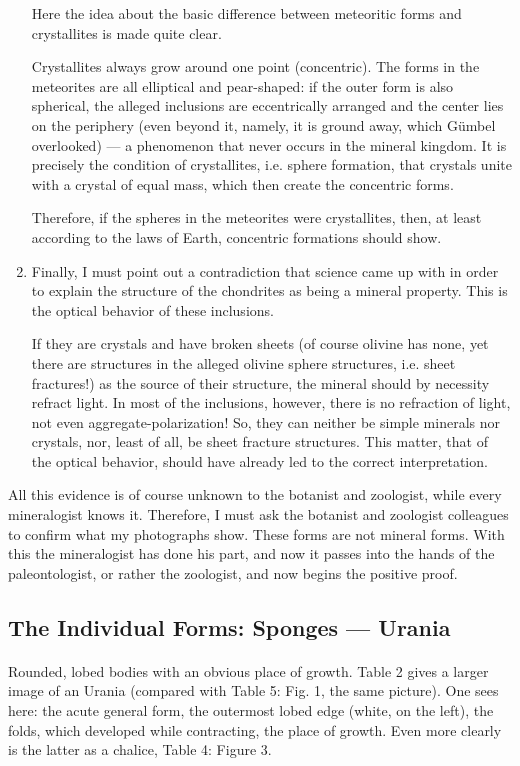 \documentclass[a4paper, 11pt, oneside]{article}
\begin{document}
\begin{enumerate}
    Here the idea about the basic difference between meteoritic forms and crystallites is made quite clear.
    
    Crystallites always grow around one point (concentric). The forms in the meteorites are all elliptical and pear-shaped: if the outer form is also spherical, the alleged inclusions are eccentrically arranged and the center lies on the periphery (even beyond it, namely, it is ground away, which Gümbel overlooked) — a phenomenon that never occurs in the mineral kingdom. It is precisely the condition of crystallites, i.e. sphere formation, that crystals unite with a crystal of equal mass, which then create the concentric forms.
    
    Therefore, if the spheres in the meteorites were crystallites, then, at least according to the laws of Earth, concentric formations should show.
    \item Finally, I must point out a contradiction that science came up with in order to explain the structure of the chondrites as being a mineral property. This is the optical behavior of these inclusions.
    
    If they are crystals and have broken sheets (of course olivine has none, yet there are structures in the alleged olivine sphere structures, i.e. sheet fractures!) as the source of their structure, the mineral should by necessity refract light. In most of the inclusions, however, there is no refraction of light, not even aggregate-polarization! So, they can neither be simple minerals nor crystals, nor, least of all, be sheet fracture structures. This matter, that of the optical behavior, should have already led to the correct interpretation.
\end{enumerate}
All this evidence is of course unknown to the botanist and zoologist, while every mineralogist knows it. Therefore, I must ask the botanist and zoologist colleagues to confirm what my photographs show. These forms are not mineral forms. With this the mineralogist has done his part, and now it passes into the hands of the paleontologist, or rather the zoologist, and now begins the positive proof.
\clearpage
\subsection{The Individual Forms: Sponges — Urania}
\paragraph{}
Rounded, lobed bodies with an obvious place of growth. Table 2 gives a larger image of an Urania (compared with Table 5: Fig. 1, the same picture). One sees here: the acute general form, the outermost lobed edge (white, on the left), the folds, which developed while contracting, the place of growth. Even more clearly is the latter as a chalice, Table 4: Figure 3.
\end{document}
